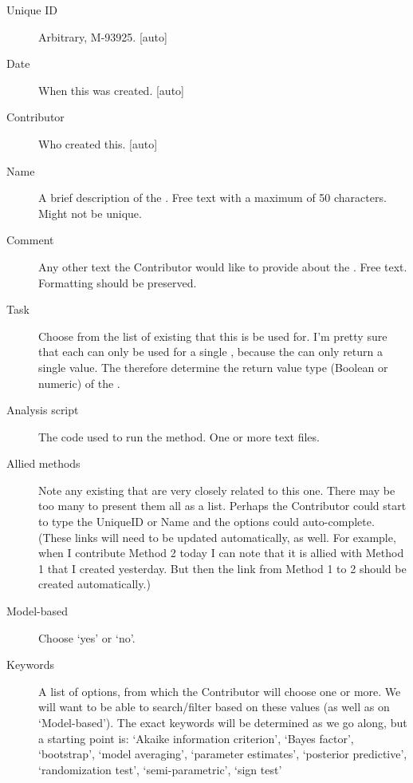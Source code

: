 \begin{description}
    \item[Unique ID] Arbitrary, \eg M-93925. [auto]
    \item[Date] When this was created. [auto]
    \item[Contributor] Who created this. [auto]
    \item[Name] A brief description of the \Method.
            Free text with a maximum of 50 characters.  Might not be unique.
    \item[Comment] Any other text the Contributor would like to provide about the \Method.
            Free text.  Formatting should be preserved.
    \item[Task] Choose from the list of existing \Tasks that this \Method is be used for.
            I'm pretty sure that each \Method can only be used for a single \Task, because the \Method can only return a single value.
            The \Task therefore determine the return value type (Boolean or numeric) of the \Method.
    \item[Analysis script] The code used to run the method.  One or more text files.
    \item[Allied methods] Note any existing \Methods that are very closely related to this one.
            There may be too many \Methods to present them all as a list.  Perhaps the Contributor could start to type the UniqueID or Name and the options could auto-complete.
            (These links will need to be updated automatically, as well.  For example, when I contribute Method 2 today I can note that it is allied with Method 1 that I created yesterday.  But then the link from Method 1 to 2 should be created automatically.)
    \item[Model-based] Choose `yes' or `no'.
    \item[Keywords] A list of options, from which the Contributor will choose one or more.
            We will want to be able to search/filter \Methods based on these values (as well as on `Model-based').
            The exact keywords will be determined as we go along, but a starting point is:
                `Akaike information criterion',
                `Bayes factor',
                `bootstrap',
                `model averaging',
                `parameter estimates',
                `posterior predictive',
                `randomization test',
                `semi-parametric',
                `sign test'
\end{description}

